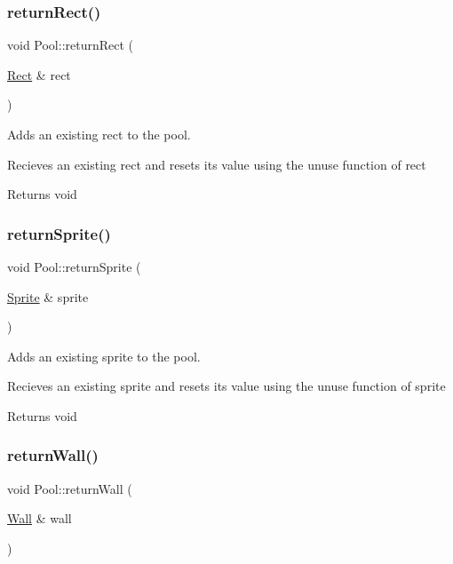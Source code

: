 \subsubsection{\texorpdfstring{return\+Rect()}{returnRect()}}
{\footnotesize\ttfamily void Pool\+::return\+Rect (\begin{DoxyParamCaption}\item[{\hyperlink{class_rect}{Rect} \&}]{rect }\end{DoxyParamCaption})}



Adds an existing rect to the pool. 

Recieves an existing rect and resets it\textquotesingle{}s value using the unuse function of rect

\begin{DoxyReturn}{Returns}
void 
\end{DoxyReturn}
\mbox{\label{class_pool_a227334c0983a0c1bf42d72a44fcfee8f}} 
\subsubsection{\texorpdfstring{return\+Sprite()}{returnSprite()}}
{\footnotesize\ttfamily void Pool\+::return\+Sprite (\begin{DoxyParamCaption}\item[{\hyperlink{class_sprite}{Sprite} \&}]{sprite }\end{DoxyParamCaption})}



Adds an existing sprite to the pool. 

Recieves an existing sprite and resets it\textquotesingle{}s value using the unuse function of sprite

\begin{DoxyReturn}{Returns}
void 
\end{DoxyReturn}
\mbox{\label{class_pool_a883e139a1b626e514a7e70dd3385e17e}} 
\subsubsection{\texorpdfstring{return\+Wall()}{returnWall()}}
{\footnotesize\ttfamily void Pool\+::return\+Wall (\begin{DoxyParamCaption}\item[{\hyperlink{class_wall}{Wall} \&}]{wall }\end{DoxyParamCaption})}



